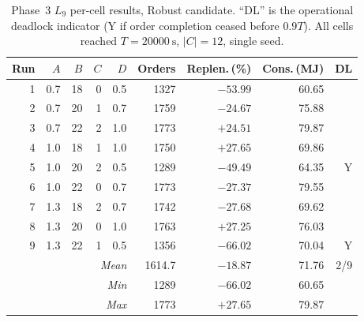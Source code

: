 \documentclass[conference]{IEEEtran}
\begin{document}
\begin{table}[t]
  \centering
  \caption{Phase~3 $L_9$ per-cell results, Robust candidate. ``DL'' is the operational deadlock indicator (Y if order completion ceased before $0.9 T$). All cells reached $T = \SI{20000}{\second}$, $|C|=12$, single seed.}
  \label{tab:l9_robust}
  \footnotesize
  \setlength{\tabcolsep}{4pt}
  \begin{tabular}{rrrrrrrrr}
    \toprule
    Run & $A$ & $B$ & $C$ & $D$ & Orders & Replen.\,(\%) & Cons.\,(MJ) & DL \\
    \midrule
     1 & 0.7 & 18 & 0 & 0.5 & 1327 & $-53.99$ & 60.65 &   \\
     2 & 0.7 & 20 & 1 & 0.7 & 1759 & $-24.67$ & 75.88 &   \\
     3 & 0.7 & 22 & 2 & 1.0 & 1773 & $+24.51$ & 79.87 &   \\
     4 & 1.0 & 18 & 1 & 1.0 & 1750 & $+27.65$ & 69.86 &   \\
     5 & 1.0 & 20 & 2 & 0.5 & 1289 & $-49.49$ & 64.35 & Y \\
     6 & 1.0 & 22 & 0 & 0.7 & 1773 & $-27.37$ & 79.55 &   \\
     7 & 1.3 & 18 & 2 & 0.7 & 1742 & $-27.68$ & 69.62 &   \\
     8 & 1.3 & 20 & 0 & 1.0 & 1763 & $+27.25$ & 76.03 &   \\
     9 & 1.3 & 22 & 1 & 0.5 & 1356 & $-66.02$ & 70.04 & Y \\
    \midrule
    \multicolumn{5}{r}{\textit{Mean}} & 1614.7 & $-18.87$ & 71.76 & 2/9 \\
    \multicolumn{5}{r}{\textit{Min}}  & 1289   & $-66.02$ & 60.65 &     \\
    \multicolumn{5}{r}{\textit{Max}}  & 1773   & $+27.65$ & 79.87 &     \\
    \bottomrule
  \end{tabular}
\end{table}
\end{document}
